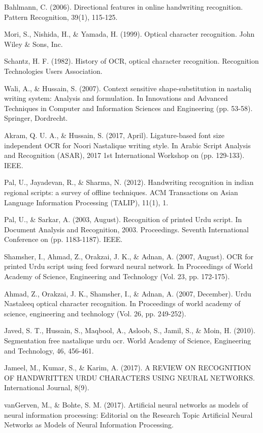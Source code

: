 \begin{thebibliography}{130}
Bahlmann, C. (2006). Directional features in online handwriting recognition. Pattern Recognition, 39(1), 115-125.

Mori, S., Nishida, H., \& Yamada, H. (1999). Optical character recognition. John Wiley \& Sons, Inc.

Schantz, H. F. (1982). History of OCR, optical character recognition. Recognition Technologies Users Association.

Wali, A., \& Hussain, S. (2007). Context sensitive shape-substitution in nastaliq writing system: Analysis and formulation. In Innovations and Advanced Techniques in Computer and Information Sciences and Engineering (pp. 53-58). Springer, Dordrecht.

Akram, Q. U. A., \& Hussain, S. (2017, April). Ligature-based font size independent OCR for Noori Nastalique writing style. In Arabic Script Analysis and Recognition (ASAR), 2017 1st International Workshop on (pp. 129-133). IEEE.

Pal, U., Jayadevan, R., \& Sharma, N. (2012). Handwriting recognition in indian regional scripts: a survey of offline techniques. ACM Transactions on Asian Language Information Processing (TALIP), 11(1), 1.

Pal, U., \& Sarkar, A. (2003, August). Recognition of printed Urdu script. In Document Analysis and Recognition, 2003. Proceedings. Seventh International Conference on (pp. 1183-1187). IEEE.

Shamsher, I., Ahmad, Z., Orakzai, J. K., \& Adnan, A. (2007, August). OCR for printed Urdu script using feed forward neural network. In Proceedings of World Academy of Science, Engineering and Technology (Vol. 23, pp. 172-175).

Ahmad, Z., Orakzai, J. K., Shamsher, I., \& Adnan, A. (2007, December). Urdu Nastaleeq optical character recognition. In Proceedings of world academy of science, engineering and technology (Vol. 26, pp. 249-252).

Javed, S. T., Hussain, S., Maqbool, A., Asloob, S., Jamil, S., \& Moin, H. (2010). Segmentation free nastalique urdu ocr. World Academy of Science, Engineering and Technology, 46, 456-461.

Jameel, M., Kumar, S., \& Karim, A. (2017). A REVIEW ON RECOGNITION OF HANDWRITTEN URDU CHARACTERS USING NEURAL NETWORKS. International Journal, 8(9).

vanGerven, M., \& Bohte, S. M. (2017). Artificial neural networks as models of neural information processing: Editorial on the Research Topic Artificial Neural Networks as Models of Neural Information Processing.


\end{thebibliography}
